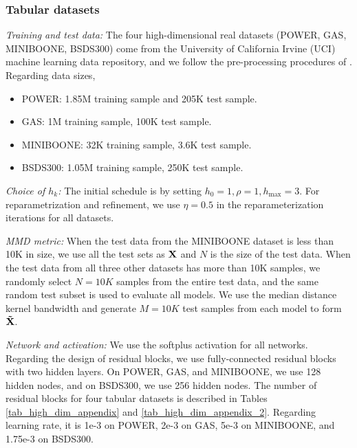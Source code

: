 \documentclass{article}
\theoremstyle{remark}
\theoremstyle{plain}
\newcommand{\revold}[1]{{\color{black}#1}}
\begin{document}
{\subsubsection{Tabular datasets}\label{sec:real_data}

\noindent
\textit{Training and test data: }The four high-dimensional real datasets (POWER, GAS, MINIBOONE, BSDS300) come from the University of California Irvine (UCI) machine learning data repository, and we follow the pre-processing procedures of \citep{papamakarios2017masked}. Regarding data sizes,
\begin{itemize}
    \item POWER: 1.85M training sample and 205K test sample. 
    \item GAS: 1M training sample, 100K test sample.
    \item MINIBOONE: 32K training sample, 3.6K test sample.
    \item BSDS300: 1.05M training sample, 250K test sample.
\end{itemize}

\noindent
\textit{Choice of $h_k$:}  The initial schedule is by setting $h_0=1, \rho=1, h_{\max}=3$. For reparametrization and refinement, we use $\eta=0.5$ in the reparameterization iterations for all datasets. 


\vspace{5pt}
\noindent
\textit{MMD metric:}
\revold{When the test data from the MINIBOONE dataset is less than 10K in size, we use all the test sets as $\bf{X}$ and $N$ is the size of the test data. When the test data from all three other datasets has more than 10K samples, we randomly select $N=10K$ samples from the entire test data,}
and the same random test subset is used to evaluate all models. 
We use the median distance kernel bandwidth and generate $M=10K$ test samples from each model to form $\bf{\tilde{X}}$.

\vspace{5pt}
\noindent
\textit{Network and activation:} We use the softplus activation for all networks. Regarding the design of residual blocks, we use fully-connected residual blocks with two hidden layers. On POWER, GAS, and MINIBOONE, we use 128 hidden nodes, and on BSDS300, we use 256 hidden nodes. The number of residual blocks for four tabular datasets is described in Tables \ref{tab_high_dim_appendix} and \ref{tab_high_dim_appendix_2}. Regarding learning rate, it is 1e-3 on POWER, 2e-3 on GAS, 5e-3 on MINIBOONE, and 1.75e-3 on BSDS300.

}
\end{document}
